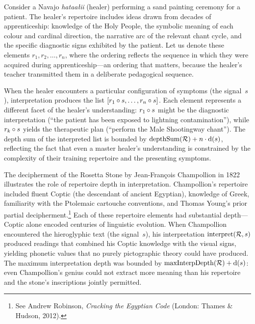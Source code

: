 \begin{example}
\label{ex:navajo-sand-painting}
Consider a Navajo \emph{hataa{\l}ii} (healer) performing a sand painting
ceremony for a patient.  The healer's repertoire includes ideas drawn
from decades of apprenticeship: knowledge of the Holy People, the
symbolic meaning of each colour and cardinal direction, the narrative arc
of the relevant chant cycle, and the specific diagnostic signs exhibited
by the patient.  Let us denote these elements $r_1, r_2, \ldots, r_n$,
where the ordering reflects the sequence in which they were acquired
during apprenticeship---an ordering that matters, because the healer's
teacher transmitted them in a deliberate pedagogical sequence.

When the healer encounters a particular configuration of symptoms (the
signal~$s$), interpretation produces the list
$[r_1 \circ s, \ldots, r_n \circ s]$.  Each element represents a
different facet of the healer's understanding: $r_1 \circ s$ might be
the diagnostic interpretation (``the patient has been exposed to
lightning contamination''), while $r_k \circ s$ yields the
therapeutic plan (``perform the Male Shootingway chant'').  The depth
sum of the interpreted list is bounded by
$\operatorname{depthSum}(\mathcal{R}) + n \cdot \operatorname{d}(s)$, reflecting the
fact that even a master healer's understanding is constrained by the
complexity of their training repertoire and the presenting symptoms.
\end{example}

\begin{example}
\label{ex:rosetta-stone}
The decipherment of the Rosetta Stone by Jean-Fran\c{c}ois Champollion
in 1822 illustrates the role of repertoire depth in interpretation.
Champollion's repertoire included fluent Coptic (the descendant of
ancient Egyptian), knowledge of Greek, familiarity with the Ptolemaic
cartouche conventions, and Thomas Young's prior partial
decipherment.\footnote{See Andrew Robinson, \emph{Cracking the Egyptian
Code} (London: Thames \& Hudson, 2012).}  Each of these repertoire
elements had substantial depth---Coptic alone encoded centuries of
linguistic evolution.  When Champollion encountered the hieroglyphic
text (the signal~$s$), his interpretation
$\operatorname{interpret}(\mathcal{R}, s)$ produced readings that combined his
Coptic knowledge with the visual signs, yielding phonetic values that
no purely pictographic theory could have produced.  The maximum
interpretation depth was bounded by
$\operatorname{maxInterpDepth}(\mathcal{R}) + \operatorname{d}(s)$: even Champollion's
genius could not extract more meaning than his repertoire and the
stone's inscriptions jointly permitted.
\end{example}

